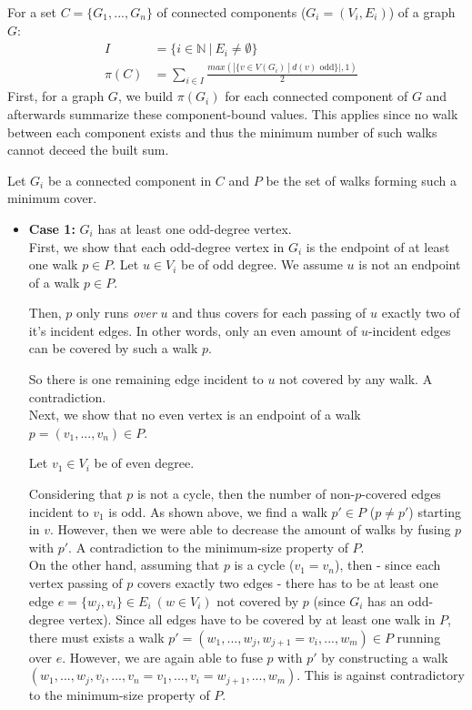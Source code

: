 \documentclass[a4paper]{article}
\begin{document}
	\begin{solution}{7}
		\begin{theorem}{
		For a set $C = \{G_1, ..., G_n\}$ of connected components ($G_i = (V_i, E_i)$) of a graph $G$:\\
		\begin{align}
			I&=\{i \in \mathbb{N}\ |\ E_i \neq \emptyset\}&\\
			\pi(C)&= \sum_{i \in I} \frac{max(|\{v \in V(G_i)\ |\ d(v) \text{ odd}\}|, 1)}{2}&
		\end{align}}			
			First, for a graph $G$, we build $\pi(G_i)$ for each connected component of $G$ and afterwards summarize these component-bound values. This applies since no walk between each component exists and thus the minimum number of such walks cannot deceed the built sum.

			Let $G_i$ be a connected component in $C$ and $P$ be the set of walks forming such a minimum cover.
			
			\begin{itemize}
				\item \textbf{Case 1:} $G_i$ has at least one odd-degree vertex.\\
					First, we show that each odd-degree vertex in $G_i$ is the endpoint of at least one walk $p \in P$.
					Let $u \in V_i$ be of odd degree. We assume $u$ is not an endpoint of a walk $p \in P$.
			
					Then, $p$ only runs \emph{over} $u$ and thus covers  for each passing of $u$ exactly two of it's incident edges.  In other words, only an even amount of $u$-incident edges can be covered by such a walk $p$.
			
					So there is one remaining edge incident to $u$ not covered by any walk. A contradiction.\\
			
			 		Next, we show that no even vertex is an endpoint of a walk $p = (v_1, ..., v_n) \in P$.
			
					Let $v_1 \in V_i$ be of even degree.
			
					Considering that $p$ is not a cycle, then the number of non-$p$-covered edges incident to $v_1$ is odd. As shown above, we find a walk $p' \in P$ ($p \neq p'$) starting in $v$. However, then we were able to decrease the amount of walks by fusing $p$ with $p'$. A contradiction to the minimum-size property of $P$.\\
			
					On the other hand, assuming that $p$ is a cycle ($v_1 = v_n$), then - since each vertex passing of $p$ covers exactly two edges - there has to be at least one edge $e = \{w_j, v_i\} \in E_i\ (w \in V_i)$ not covered by $p$ (since $G_i$ has an odd-degree vertex). Since all edges have to be covered by at least one walk in $P$, there must exists a walk $p' = (w_1, ..., w_j,w_{j+1} = v_i, ..., w_m) \in P$ running over $e$. However, we are again able to fuse $p$ with $p'$  by constructing a walk $(w_1, ..., w_j, v_i, ..., v_n = v_1, ..., v_i = w_{j+1}, ..., w_m)$. This is against contradictory to the minimum-size property of $P$.\\
					

\end{itemize}
\end{theorem}
\end{solution}
\end{document}
